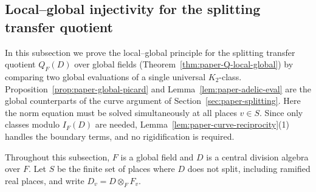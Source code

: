 \subsection{Local--global injectivity for the splitting transfer quotient}\label{sec:paper-Q-local-global}
In this subsection we prove the local--global principle for the splitting transfer quotient $Q_F(D)$ over global fields (Theorem~\ref{thm:paper-Q-local-global}) by comparing two global evaluations of a single universal $K_2$-class.
Proposition~\ref{prop:paper-global-picard} and Lemma~\ref{lem:paper-adelic-eval} are the global counterparts of the curve argument of Section~\ref{sec:paper-splitting}.
Here the norm equation must be solved simultaneously at all places $v\in S$.
Since only classes modulo $I_F(D)$ are needed, Lemma~\ref{lem:paper-curve-reciprocity}(1) handles the boundary terms, and no rigidification is required.

Throughout this subsection, $F$ is a global field and $D$ is a central division algebra over $F$.
Let $S$ be the finite set of places where $D$ does not split, including ramified real places, and write $D_v=D\otimes_FF_v$.

